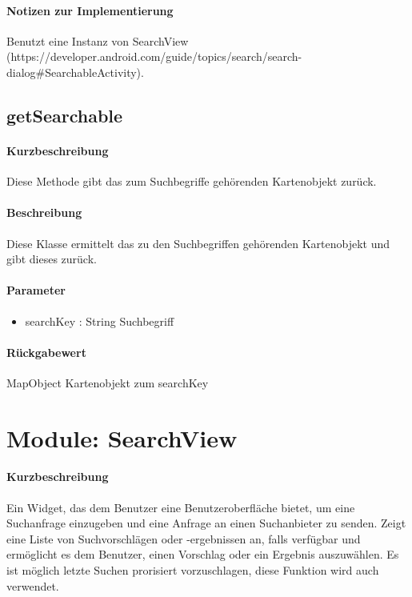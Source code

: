 \paragraph*{Notizen zur Implementierung}
Benutzt eine Instanz von SearchView (https://developer.android.com/guide/topics/search/search-dialog#SearchableActivity).

\subsection{getSearchable}%
\paragraph*{Kurzbeschreibung}
Diese Methode gibt das zum Suchbegriffe gehörenden Kartenobjekt zurück.
\paragraph*{Beschreibung}
Diese Klasse ermittelt das zu den Suchbegriffen gehörenden Kartenobjekt und gibt dieses zurück.
\paragraph*{Parameter}
\begin{itemize}
    \item searchKey : String Suchbegriff
\end{itemize}
\paragraph*{Rückgabewert}
MapObject Kartenobjekt zum searchKey


\section{Module: SearchView}
\paragraph*{Kurzbeschreibung}
Ein Widget, das dem Benutzer eine Benutzeroberfläche bietet, um eine Suchanfrage einzugeben und eine Anfrage an einen Suchanbieter zu senden. 
Zeigt eine Liste von Suchvorschlägen oder -ergebnissen an, falls verfügbar 
und ermöglicht es dem Benutzer, einen Vorschlag oder ein Ergebnis auszuwählen.
Es ist möglich letzte Suchen prorisiert vorzuschlagen, diese Funktion wird auch verwendet.
